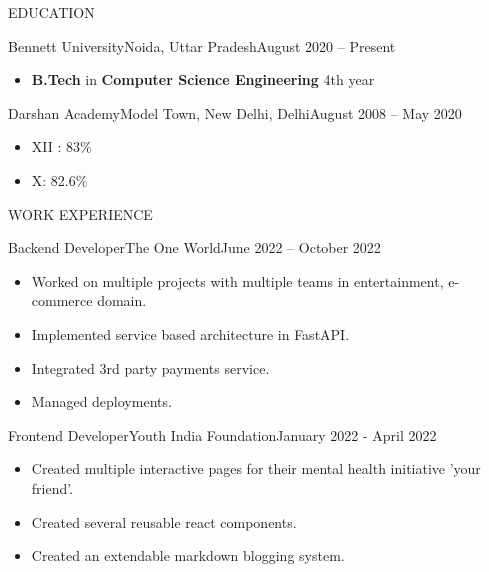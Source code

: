 \documentclass[]{mcdowellcv}
\begin{document}
	\makeheader
	

\begin{cvsection}{EDUCATION}
		\begin{cvsubsection}{Bennett University}{Noida, Uttar Pradesh}{August 2020 -- Present}
			\begin{itemize}
				\item {\bf B.Tech} in {\bf Computer Science Engineering} 4th year
			\end{itemize}
		\end{cvsubsection}
            \begin{cvsubsection}{Darshan Academy}{Model Town, New Delhi, Delhi}{August 2008 -- May 2020}
			\begin{itemize}
				\item XII : 83\%
                    \item X: 82.6\%
			\end{itemize}
		\end{cvsubsection}
	\end{cvsection}

	\begin{cvsection}{WORK EXPERIENCE}
		\begin{cvsubsection}{Backend Developer}{The One World}{June 2022 – October 2022}
			\begin{itemize}
            \item Worked on multiple projects with multiple teams in entertainment, e-commerce domain.
            \item Implemented service based architecture in FastAPI.
            \item Integrated 3rd party payments service.
            \item Managed deployments.
			\end{itemize}
		\end{cvsubsection}
		
		\begin{cvsubsection}{Frontend Developer}{Youth India Foundation}{January 2022 - April 2022}	
			\begin{itemize}
            	\item Created multiple interactive pages for their mental health initiative 'your friend'.
            	\item Created several reusable react components. 
            	\item Created an extendable markdown blogging system.
			\end{itemize}
		\end{cvsubsection}

	\end{cvsection}
\end{document}
